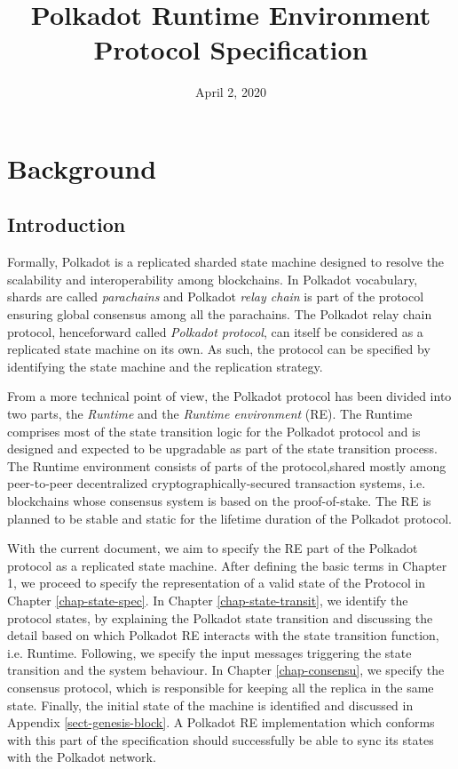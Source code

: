 \documentclass{book}
\newcommand{\tmem}[1]{{\em #1\/}}
\newcommand{\tmtextit}[1]{{\itshape{#1}}}
\providecommand{\tmem}[1]{\tmtextit{#1}}
\providecommand{\tmtextit}[1]{\tmtextit{#1}}
\begin{document}
\title{
  Polkadot Runtime Environment\\
  {\Large Protocol Specification}
}

\date{April 2, 2020}

\maketitle

{\tableofcontents}

\chapter{Background}

\section{Introduction}

Formally, Polkadot is a replicated sharded state machine designed to resolve
the scalability and interoperability among blockchains. In Polkadot
vocabulary, shards are called {\tmem{parachains}} and Polkadot {\tmem{relay
chain}} is part of the protocol ensuring global consensus among all the
parachains. The Polkadot relay chain protocol, henceforward called
{\tmem{Polkadot protocol}}, can itself be considered as a replicated state
machine on its own. As such, the protocol can be specified by identifying the
state machine and the replication strategy.

From a more technical point of view, the Polkadot protocol has been divided
into two parts, the {\tmem{Runtime}} and the {\tmem{Runtime environment}}
(RE). The Runtime comprises most of the state transition logic for the
Polkadot protocol and is designed and expected to be upgradable as part of the
state transition process. The Runtime environment consists of parts of the
protocol,\quad shared mostly among peer-to-peer decentralized
cryptographically-secured transaction systems, i.e. blockchains whose
consensus system is based on the proof-of-stake. The RE is planned to be
stable and static for the lifetime duration of the Polkadot protocol.

With the current document, we aim to specify the RE part of the Polkadot
protocol as a replicated state machine. After defining the basic terms in
Chapter 1, we proceed to specify the representation of a valid state of the
Protocol in Chapter \ref{chap-state-spec}. In Chapter
\ref{chap-state-transit}, we identify the protocol states, by explaining the
Polkadot state transition and discussing the detail based on which Polkadot RE
interacts with the state transition function, i.e. Runtime. Following, we
specify the input messages triggering the state transition and the system
behaviour. In Chapter \ref{chap-consensu}, we specify the consensus protocol,
which is responsible for keeping all the replica in the same state. Finally,
the initial state of the machine is identified and discussed in Appendix
\ref{sect-genesis-block}. A Polkadot RE implementation which conforms with
this part of the specification should successfully be able to sync its states
with the Polkadot network.
\end{document}
